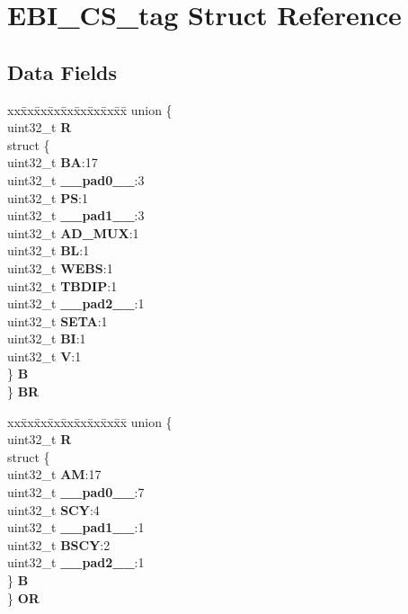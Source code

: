 \hypertarget{structEBI__CS__tag}{}\section{E\+B\+I\+\_\+\+C\+S\+\_\+tag Struct Reference}
\label{structEBI__CS__tag}
\subsection*{Data Fields}
\begin{DoxyCompactItemize}
\item 
\mbox{\label{structEBI__CS__tag_a9dae28cfff2cf0266fb552c799dcecfb}} 
\begin{tabbing}
xx\=xx\=xx\=xx\=xx\=xx\=xx\=xx\=xx\=\kill
union \{\\
\>uint32\_t {\bfseries R}\\
\>struct \{\\
\>\>uint32\_t {\bfseries BA}:17\\
\>\>uint32\_t {\bfseries \_\_pad0\_\_}:3\\
\>\>uint32\_t {\bfseries PS}:1\\
\>\>uint32\_t {\bfseries \_\_pad1\_\_}:3\\
\>\>uint32\_t {\bfseries AD\_MUX}:1\\
\>\>uint32\_t {\bfseries BL}:1\\
\>\>uint32\_t {\bfseries WEBS}:1\\
\>\>uint32\_t {\bfseries TBDIP}:1\\
\>\>uint32\_t {\bfseries \_\_pad2\_\_}:1\\
\>\>uint32\_t {\bfseries SETA}:1\\
\>\>uint32\_t {\bfseries BI}:1\\
\>\>uint32\_t {\bfseries V}:1\\
\>\} {\bfseries B}\\
\} {\bfseries BR}\\

\end{tabbing}\item 
\mbox{\label{structEBI__CS__tag_a21f927c159c06adf7295bfd235056138}} 
\begin{tabbing}
xx\=xx\=xx\=xx\=xx\=xx\=xx\=xx\=xx\=\kill
union \{\\
\>uint32\_t {\bfseries R}\\
\>struct \{\\
\>\>uint32\_t {\bfseries AM}:17\\
\>\>uint32\_t {\bfseries \_\_pad0\_\_}:7\\
\>\>uint32\_t {\bfseries SCY}:4\\
\>\>uint32\_t {\bfseries \_\_pad1\_\_}:1\\
\>\>uint32\_t {\bfseries BSCY}:2\\
\>\>uint32\_t {\bfseries \_\_pad2\_\_}:1\\
\>\} {\bfseries B}\\
\} {\bfseries OR}\\


\end{tabbing}
\end{DoxyCompactItemize}
